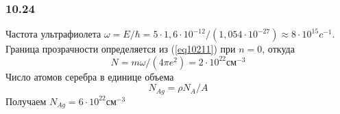 \subsubsection*{10.24}
Частота ультрафиолета $\omega = E / \hbar = 5 \cdot 1,6 \cdot 10^{-12} / (1,054 \cdot 10^{-27}) \approx 8 \cdot 10^{15} c^{-1}$. Граница прозрачности определяется из (\ref{eq10211}) при $n=0$, откуда 
\begin{equation*}
	N = m \omega / (4\pi e^2) = 2 \cdot 10^{22} см^{-3}
\end{equation*}
Число атомов серебра в единице объема
\begin{equation*}
	N_{Ag} = \rho N_A / A
\end{equation*}
Получаем $N_{Ag} = 6 \cdot 10^{22} см^{-3}$